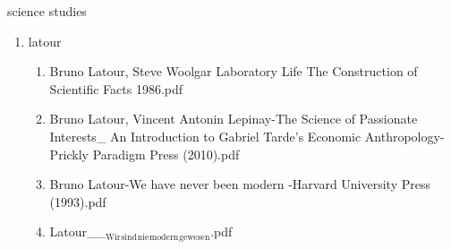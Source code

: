 \documentclass[11pt]{article}
\begin{document}
\item science studies
\label{sec-1-1-1-1-43}
\begin{enumerate}
\item latour
\label{sec-1-1-1-1-43-1}
\begin{enumerate}
\item Bruno Latour, Steve Woolgar Laboratory Life The Construction of Scientific Facts  1986.pdf
\label{sec-1-1-1-1-43-1-1}

\item Bruno Latour, Vincent Antonin Lepinay-The Science of Passionate Interests\_ An Introduction to Gabriel Tarde's Economic Anthropology-Prickly Paradigm Press (2010).pdf
\label{sec-1-1-1-1-43-1-2}

\item Bruno Latour-We have never been modern  -Harvard University Press (1993).pdf
\label{sec-1-1-1-1-43-1-3}

\item Latour\_\_$_{\text{Wir}}$$_{\text{sind}}$$_{\text{nie}}$$_{\text{modern}}$$_{\text{gewesen}}$.pdf
\label{sec-1-1-1-1-43-1-4}
\end{enumerate}
\end{enumerate}
\end{document}
